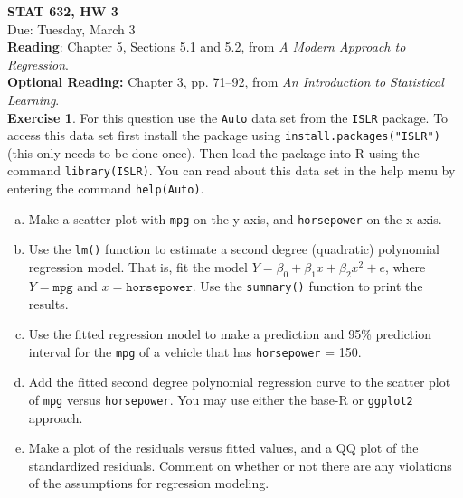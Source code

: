 \documentclass[11pt]{article}\usepackage[]{graphicx}\usepackage[]{color}
\begin{document}
\setlength\parindent{0pt}

\textbf{STAT 632, HW 3}\\
Due: Tuesday, March 3\\

\textbf{Reading}: Chapter 5, Sections 5.1 and 5.2, from \emph{A Modern Approach to Regression}.\\
\textbf{Optional Reading:} Chapter 3, pp. 71--92, from \emph{An Introduction to Statistical Learning}.\\

\textbf{Exercise 1}.  For this question use the \texttt{Auto} data set from the \texttt{ISLR} package.  To access this data set first install the package using \texttt{install.packages("ISLR")} (this only needs to be done once).  Then load the package into R using the command \texttt{library(ISLR)}.  You can read about this data set in the help menu by entering the command \texttt{help(Auto)}.
\begin{enumerate}[(a)]
\item Make a scatter plot with \texttt{mpg} on the y-axis, and \texttt{horsepower} on the x-axis.
\item Use the \texttt{lm()} function to estimate a second degree (quadratic) polynomial regression model.  That is, fit the model $Y= \beta_0 + \beta_1 x + \beta_2 x^2 + e$, where $Y = \texttt{mpg}$ and $x = \texttt{horsepower}$.  Use the \texttt{summary()} function to print the results.
\item Use the fitted regression model to make a prediction and 95\% prediction interval for the \texttt{mpg} of a vehicle that has \texttt{horsepower} = 150.
\item Add the fitted second degree polynomial regression curve to the scatter plot of \texttt{mpg} versus \texttt{horsepower}.  You may use either the base-R or \texttt{ggplot2} approach.
\item Make a plot of the residuals versus fitted values, and a QQ plot of the standardized residuals.  Comment on whether or not there are any violations of the assumptions for regression modeling.\\
\end{enumerate}
\vspace{11pt}
\end{document}
